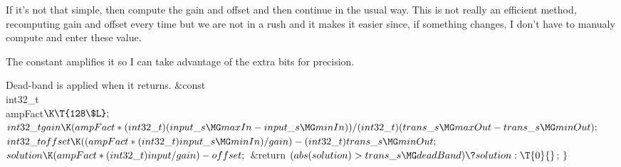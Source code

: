 If it's not that simple, then compute the gain and offset and then continue in
the usual way.
This is not really an efficient method, recomputing gain and offset every time
but we are not in a rush and it makes it easier since, if something changes,
I don't have to manualy compute and enter these value.

The constant  amplifies it so I can take advantage of the
extra
bits for precision.

Dead-band is applied when it returns.
\Y\B\&{const} \\{int32\_t}\\{ampFact}${}\K\T{128\$L};{}$\7
${}\\{int32\_t}\\{gain}\K(\\{ampFact}*(\\{int32\_t})(\\{input\_s}\MG\\{maxIn}-%
\\{input\_s}\MG\\{minIn}))/(\\{int32\_t})(\\{trans\_s}\MG\\{maxOut}-\\{trans%
\_s}\MG\\{minOut});{}$\6
${}\\{int32\_t}\\{offset}\K((\\{ampFact}*(\\{int32\_t})\\{input\_s}\MG%
\\{minIn})/\\{gain})-(\\{int32\_t})\\{trans\_s}\MG\\{minOut};{}$\6
${}\\{solution}\K(\\{ampFact}*(\\{int32\_t})\\{input}/\\{gain})-\\{offset};{}$\6
\&{return} ${}(\\{abs}(\\{solution})>\\{trans\_s}\MG\\{deadBand})\?%
\\{solution}:\T{0}{}$;\7
$\}{}$\Y\par
\fi

